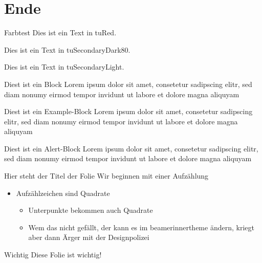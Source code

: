 \documentclass[fleqn,10pt,tocinheader,widetoc,blue]{beamer}
\begin{document}
\section{Ende}

\begin{frame}{Farbtest}
  \color{tuRed}
  Dies ist ein Text in tuRed.

  \color{tuSecondaryDark80}
  Dies ist ein Text in tuSecondaryDark80.

  \color{tuSecondaryLight}
  Dies ist ein Text in tuSecondaryLight.

  \begin{block}{Diest ist ein Block}
    Lorem ipsum dolor sit amet, consetetur sadipscing elitr, sed diam
    nonumy eirmod tempor invidunt ut labore et dolore magna aliquyam
  \end{block}
  
  \begin{exampleblock}{Diest ist ein Example-Block}
    Lorem ipsum dolor sit amet, consetetur sadipscing elitr, sed diam
    nonumy eirmod tempor invidunt ut labore et dolore magna aliquyam
  \end{exampleblock}

  \begin{alertblock}{Diest ist ein Alert-Block}
    Lorem ipsum dolor sit amet, consetetur sadipscing elitr, sed diam
    nonumy eirmod tempor invidunt ut labore et dolore magna aliquyam
  \end{alertblock}
\end{frame}

\begin{frame}{Hier steht der Titel der Folie}
Wir beginnen mit einer Aufzählung
\begin{itemize}
\item Aufzählzeichen sind Quadrate
\begin{itemize}
\item Unterpunkte bekommen auch Quadrate
\item Wem das nicht gefällt, der kann es im beamerinnertheme ändern,
  kriegt aber dann Ärger mit der Designpolizei
\end{itemize}
\end{itemize}

\end{frame}


\begin{highlightframe}{Wichtig}
Diese Folie ist wichtig!
\end{highlightframe}
\end{document}

